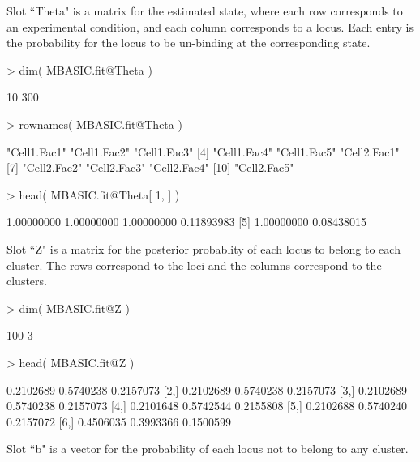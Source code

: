 \documentclass[a4paper,10pt]{article}
\begin{document}
Slot ``Theta" is a matrix for the estimated state, where each row corresponds to an experimental condition, and each column corresponds to a locus. Each entry is the probability for the locus to be un-binding at the corresponding state.

\begin{Schunk}
\begin{Sinput}
> dim( MBASIC.fit@Theta )
\end{Sinput}
\begin{Soutput}
[1]  10 300
\end{Soutput}
\begin{Sinput}
> rownames( MBASIC.fit@Theta )
\end{Sinput}
\begin{Soutput}
 [1] "Cell1.Fac1" "Cell1.Fac2" "Cell1.Fac3"
 [4] "Cell1.Fac4" "Cell1.Fac5" "Cell2.Fac1"
 [7] "Cell2.Fac2" "Cell2.Fac3" "Cell2.Fac4"
[10] "Cell2.Fac5"
\end{Soutput}
\begin{Sinput}
> head( MBASIC.fit@Theta[ 1, ] )
\end{Sinput}
\begin{Soutput}
[1] 1.00000000 1.00000000 1.00000000 0.11893983
[5] 1.00000000 0.08438015
\end{Soutput}
\end{Schunk}

Slot ``Z" is a matrix for the posterior probablity of each locus to belong to each cluster. The rows correspond to the loci and the columns correspond to the clusters.

\begin{Schunk}
\begin{Sinput}
> dim( MBASIC.fit@Z )
\end{Sinput}
\begin{Soutput}
[1] 100   3
\end{Soutput}
\begin{Sinput}
> head( MBASIC.fit@Z )
\end{Sinput}
\begin{Soutput}
          [,1]      [,2]      [,3]
[1,] 0.2102689 0.5740238 0.2157073
[2,] 0.2102689 0.5740238 0.2157073
[3,] 0.2102689 0.5740238 0.2157073
[4,] 0.2101648 0.5742544 0.2155808
[5,] 0.2102688 0.5740240 0.2157072
[6,] 0.4506035 0.3993366 0.1500599
\end{Soutput}
\end{Schunk}

Slot ``b" is a vector for the probability of each locus not to belong to any cluster. 
\end{document}
